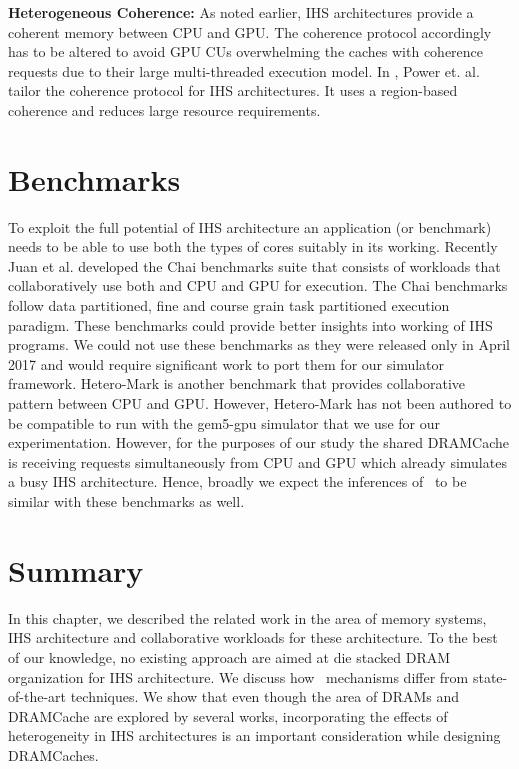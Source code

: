 \par \textbf{Heterogeneous Coherence:} As noted earlier, IHS architectures provide a coherent memory between CPU and GPU. The coherence protocol accordingly has to be altered to avoid GPU CUs overwhelming the caches with coherence requests due to their large multi-threaded execution model. In \cite{hsc-coherence}, Power et. al. tailor the coherence protocol for IHS architectures. It uses a region-based coherence and reduces large resource requirements.

\section{Benchmarks} \label{related-work-benchmarks}
To exploit the full potential of IHS architecture an application (or benchmark) needs to be able to use both the types of cores suitably in its working. Recently Juan et al. developed the Chai benchmarks suite \cite{chai} that consists of workloads that collaboratively use both and CPU and GPU for execution. The Chai benchmarks follow data partitioned, fine and course grain task partitioned execution paradigm. These benchmarks could provide better insights into working of IHS programs. We could not use these benchmarks as they were released only in April 2017 and would require significant work to port them for our simulator framework. Hetero-Mark \cite{hetero-mark} is another benchmark that provides collaborative pattern between CPU and GPU. However, Hetero-Mark has not been authored to be compatible to run with the gem5-gpu simulator that we use for our experimentation. However, for the purposes of our study the shared DRAMCache is receiving requests simultaneously from CPU and GPU which already simulates a busy IHS architecture.  Hence, broadly we expect the inferences of \cachename\ to be similar with these benchmarks as well.

\section{Summary}
In this chapter, we described the related work in the area of memory systems, IHS architecture and collaborative workloads for these architecture. To the best of our knowledge, no existing approach are aimed at die stacked DRAM organization for IHS architecture. We discuss how \cachename\ mechanisms differ from state-of-the-art techniques. We show that even though the area of DRAMs and DRAMCache are explored by several works, incorporating the effects of heterogeneity in IHS architectures is an important consideration while designing DRAMCaches.